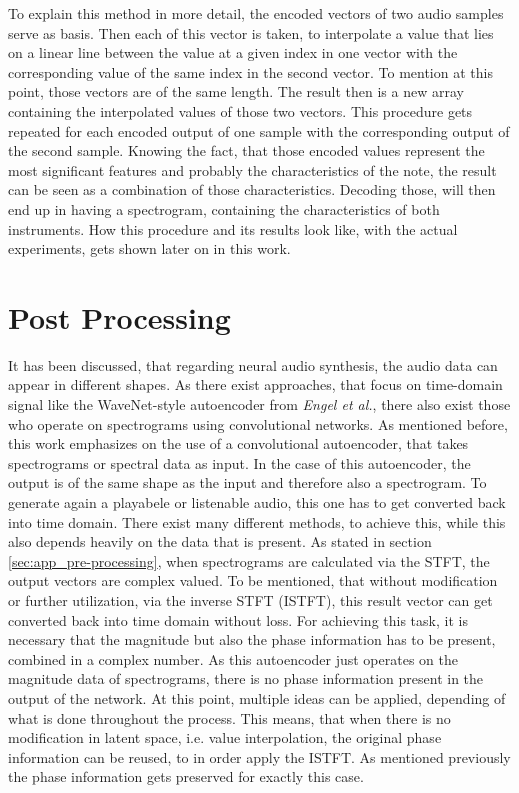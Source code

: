 To explain this method in more detail, the encoded vectors of two audio samples serve as basis. Then each of this vector is taken, to interpolate a value that lies on a linear line between the value at a given index in one vector with the corresponding value of the same index in the second vector. To mention at this point, those vectors are of the same length. The result then is a new array containing the interpolated values of those two vectors. This procedure gets repeated for each encoded output of one sample with the corresponding output of the second sample. Knowing the fact, that those encoded values represent the most significant features and probably the characteristics of the note, the result can be seen as a combination of those characteristics. Decoding those, will then end up in having a spectrogram, containing the characteristics of both instruments. How this procedure and its results look like, with the actual experiments, gets shown later on in this work. 

\section{Post Processing}
\label{sec:app_post_processing}
It has been discussed, that regarding neural audio synthesis, the audio data can appear in different shapes. As there exist approaches, that focus on time-domain signal like the WaveNet-style autoencoder from \textit{Engel et al.}, there also exist those who operate on spectrograms using convolutional networks. As mentioned before, this work emphasizes on the use of a convolutional autoencoder, that takes spectrograms or spectral data as input. In the case of this autoencoder, the output is of the same shape as the input and therefore also a spectrogram. To generate again a playabele or listenable audio, this one has to get converted back into time domain. There exist many different methods, to achieve this, while this also depends heavily on the data that is present. As stated in section \ref{sec:app_pre-processing}, when spectrograms are calculated via the STFT, the output vectors are complex valued. To be mentioned, that without modification or further utilization, via the inverse STFT (ISTFT), this result vector can get converted back into time domain without loss. For achieving this task, it is necessary that the magnitude but also the phase information has to be present, combined in a complex number. As this autoencoder just operates on the magnitude data of spectrograms, there is no phase information present in the output of the network. At this point, multiple ideas can be applied, depending of what is done throughout the process. This means, that when there is no modification in latent space, i.e. value interpolation, the original phase information can be reused, to in order apply the ISTFT. As mentioned previously the phase information gets preserved for exactly this case. 

